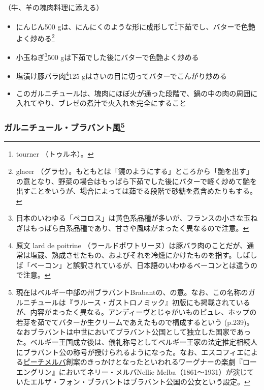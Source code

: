 \begin{recette}


（牛、羊の塊肉料理に添える）

\begin{itemize}
\item
  にんじん500 gは、にんにくのような形に成形して\footnote{tourner
    （トゥルネ）。}下茹でし、バターで色艶よく炒める\footnote{glacer
    （グラセ）。もともとは「鏡のようにする」ところから「艶を出す」の意となり、野菜の場合はもっぱら下茹でした後にバターで軽く炒めて艶を出すことをいうが、場合によっては茹でる段階で砂糖を煮含めたりもする。}
\item
  小玉ねぎ\footnote{日本のいわゆる「ペコロス」は黄色系品種が多いが、フランスの小さな玉ねぎはもっぱら白系品種であり、甘さや風味がまったく異なるので注意。}500
  gは下茹でした後にバターで色艶よく炒める
\item
  塩漬け豚バラ肉\footnote{原文 lard de poitrine
    （ラールドポワトリーヌ）は豚バラ肉のことだが、通常は塩蔵、熟成させたもの、およびそれを冷燻にかけたものを指す。しばしば「ベーコン」と誤訳されているが、日本語のいわゆるベーコンとは違うので注意。}125
  gはさいの目に切ってバターでこんがり炒める
\item
  このガルニチュールは、塊肉にほぼ火が通った段階で、鍋の中の肉の周囲に入れてやり、ブレゼの煮汁で火入れを完全にすること
\end{itemize}

\hypertarget{garniture-brabanconne}{%
\subsubsection[ガルニチュール・ブラバント風]{\texorpdfstring{ガルニチュール・ブラバント風\footnote{現在はベルギー中部の州ブラバントBrabantの、の意。なお、この名称のガルニチュールは『ラルース・ガストロノミック』初版にも掲載されているが、内容がまったく異なる。アンディーヴとじゃがいものピュレ、ホップの若芽を茹でてバターか生クリームであえたもので構成するという
  (p.239)。なおブラバントは中世においてブラバント公国として独立した国家であった。ベルギー王国成立後は、儀礼称号としてベルギー王家の法定推定相続人にブラバント公の称号が授けられるようになった。なお、エスコフィエによる\protect\hyperlink{peches-melba}{ピーチメルバ}創案のきっかけとなったといわれるワーグナーの楽劇『ローエングリン』においてネリー・メルバNellie
  Melba（1861〜1931）が演じていたエルザ・フォン・ブラバントはブラバント公国の公女という設定。}}{ガルニチュール・ブラバント風}}\label{garniture-brabanconne}}


\end{recette}
